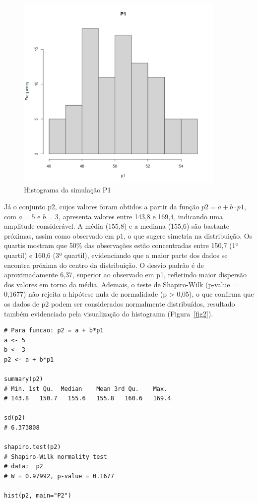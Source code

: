 \documentclass{article}
\begin{document}
\begin{figure}[h] %
    \centering
    \includegraphics[width=0.9\textwidth]{figures/p1.png} %
    \caption{Histograma da simulação P1}
    \label{fig1}
\end{figure}

Já o conjunto p2, cujos valores foram obtidos a partir da função $p2 = a + b \cdot p1$, com $a = 5$ e $b = 3$, apresenta valores entre 143,8 e 169,4, indicando uma amplitude considerável. A média (155,8) e a mediana (155,6) são bastante próximas, assim como observado em p1, o que sugere simetria na distribuição. Os quartis mostram que 50\% das observações estão concentradas entre 150,7 (1º quartil) e 160,6 (3º quartil), evidenciando que a maior parte dos dados se encontra próxima do centro da distribuição. O desvio padrão é de aproximadamente 6,37, superior ao observado em p1, refletindo maior dispersão dos valores em torno da média. Ademais, o teste de Shapiro-Wilk (p-value = 0,1677) não rejeita a hipótese nula de normalidade (p > 0,05), o que confirma que os dados de p2 podem ser considerados normalmente distribuídos, resultado também evidenciado pela visualização do histograma (Figura~\ref{fig2}).

\begin{lstlisting}
# Para funcao: p2 = a + b*p1
a <- 5
b <- 3
p2 <- a + b*p1

summary(p2)
# Min. 1st Qu.  Median    Mean 3rd Qu.    Max. 
# 143.8   150.7   155.6   155.8   160.6   169.4

sd(p2)
# 6.373808

shapiro.test(p2)
# Shapiro-Wilk normality test
# data:  p2
# W = 0.97992, p-value = 0.1677

hist(p2, main="P2")
\end{lstlisting}
\end{document}
